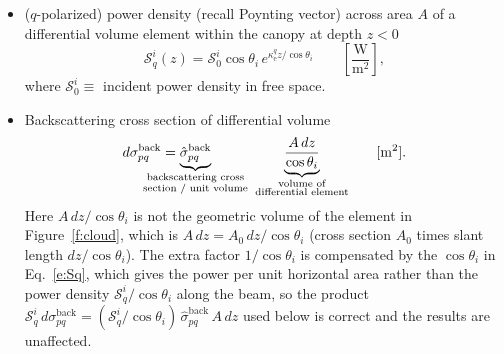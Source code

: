 \documentclass[11pt, oneside]{article}
\newcommand{\ke}[1]{\kappa_\mathrm{e}^{#1}}
\newcommand{\sback}{\hat{\sigma}^\mathrm{back}_{pq}}
\begin{document}
\begin{itemize}
	\item ($q$-polarized) power density (recall Poynting vector) across area $A$ of a differential volume element within the canopy at depth $z<0$
	\begin{equation}
		\label{e:Sq}
		\mathcal{S}_q^i(z) = \mathcal{S}_0^i\cos\theta_i\,e^{\ke{q}z/\cos\theta_i} \qquad \left[\frac{\mathrm{W}}{\mathrm{m}^2}\right],
	\end{equation}
	where $\mathcal{S}_0^i \equiv$ incident power density in free space.
	\item Backscattering cross section of differential volume
	\begin{equation}
		\label{e:dsig}
		d\sigma^\mathrm{back}_{pq} = \underbrace{\sback}_{\mathclap{\substack{\text{backscattering cross}\\\text{section / unit volume}}}}\qquad\quad \underbrace{\frac{A\,dz}{\cos\theta_i}}_{\substack{\text{volume of}\\\text{differential element}}} \qquad [\mathrm{m}^2].
	\end{equation}
	Here $A\,dz/\cos\theta_i$ is not the geometric volume of the element in Figure~\ref{f:cloud}, which is $A\,dz = A_0\,dz/\cos\theta_i$ (cross section $A_0$ times slant length $dz/\cos\theta_i$). The extra factor $1/\cos\theta_i$ is compensated by the $\cos\theta_i$ in Eq.~\eqref{e:Sq}, which gives the power per unit horizontal area rather than the power density $\mathcal{S}_q^i/\cos\theta_i$ along the beam, so the product $\mathcal{S}_q^i\,d\sigma^\mathrm{back}_{pq} = (\mathcal{S}_q^i/\cos\theta_i)\,\sback\,A\,dz$ used below is correct and the results are unaffected.

\end{itemize}
\end{document}
